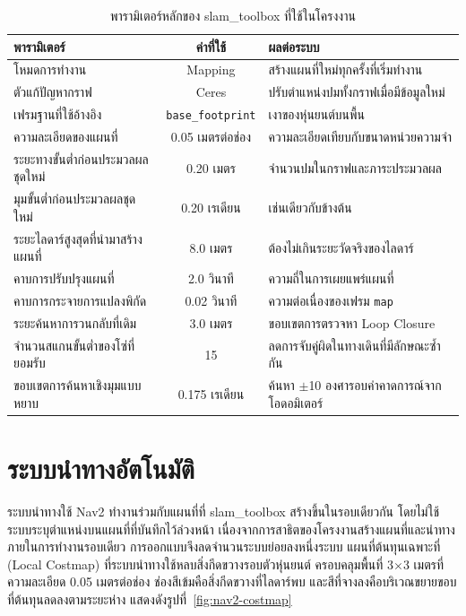 \documentclass[a4paper,12pt]{report}
\begin{document}
\begin{table}[H]
\centering
\caption[พารามิเตอร์หลักของ slam\_toolbox ที่ใช้ในโครงงาน (บทที่ 4)]{พารามิเตอร์หลักของ slam\_toolbox ที่ใช้ในโครงงาน}
\label{tab:slamparam}
\small
\begin{tabularx}{\textwidth}{|>{\raggedright\arraybackslash}p{5.2cm}|c|X|}
\hline
\textbf{พารามิเตอร์} & \textbf{ค่าที่ใช้} & \textbf{ผลต่อระบบ} \\
\hline
โหมดการทำงาน & Mapping & สร้างแผนที่ใหม่ทุกครั้งที่เริ่มทำงาน \\
\hline
ตัวแก้ปัญหากราฟ & Ceres & ปรับตำแหน่งปมทั้งกราฟเมื่อมีข้อมูลใหม่ \\
\hline
เฟรมฐานที่ใช้อ้างอิง & \texttt{base\_footprint} & เงาของหุ่นยนต์บนพื้น \\
\hline
ความละเอียดของแผนที่ & 0.05 เมตรต่อช่อง & ความละเอียดเทียบกับขนาดหน่วยความจำ \\
\hline
ระยะทางขั้นต่ำก่อนประมวลผลชุดใหม่ & 0.20 เมตร & จำนวนปมในกราฟและภาระประมวลผล \\
\hline
มุมขั้นต่ำก่อนประมวลผลชุดใหม่ & 0.20 เรเดียน & เช่นเดียวกับข้างต้น \\
\hline
ระยะไลดาร์สูงสุดที่นำมาสร้างแผนที่ & 8.0 เมตร & ต้องไม่เกินระยะวัดจริงของไลดาร์ \\
\hline
คาบการปรับปรุงแผนที่ & 2.0 วินาที & ความถี่ในการเผยแพร่แผนที่ \\
\hline
คาบการกระจายการแปลงพิกัด & 0.02 วินาที & ความต่อเนื่องของเฟรม \texttt{map} \\
\hline
ระยะค้นหาการวนกลับที่เดิม & 3.0 เมตร & ขอบเขตการตรวจหา Loop Closure \\
\hline
จำนวนสแกนขั้นต่ำของโซ่ที่ยอมรับ & 15 & ลดการจับคู่ผิดในทางเดินที่มีลักษณะซ้ำกัน \\
\hline
ขอบเขตการค้นหาเชิงมุมแบบหยาบ & 0.175 เรเดียน & ค้นหา $\pm$10 องศารอบค่าคาดการณ์จากโอดอมิเตอร์ \\
\hline
\end{tabularx}
\end{table}


\section{ระบบนำทางอัตโนมัติ}

ระบบนำทางใช้ Nav2 ทำงานร่วมกับแผนที่ที่ slam\_toolbox สร้างขึ้นในรอบเดียวกัน
โดยไม่ใช้ระบบระบุตำแหน่งบนแผนที่ที่บันทึกไว้ล่วงหน้า
เนื่องจากการสาธิตของโครงงานสร้างแผนที่และนำทางภายในการทำงานรอบเดียว
การออกแบบจึงลดจำนวนระบบย่อยลงหนึ่งระบบ
แผนที่ต้นทุนเฉพาะที่ (Local Costmap) ที่ระบบนำทางใช้หลบสิ่งกีดขวางรอบตัวหุ่นยนต์
ครอบคลุมพื้นที่ 3$\times$3 เมตรที่ความละเอียด 0.05 เมตรต่อช่อง
ช่องสีเข้มคือสิ่งกีดขวางที่ไลดาร์พบ และสีที่จางลงคือบริเวณขยายขอบที่ต้นทุนลดลงตามระยะห่าง
แสดงดังรูปที่~\ref{fig:nav2-costmap}
\end{document}
